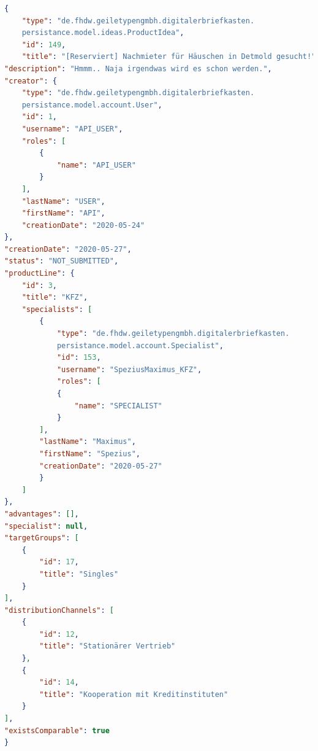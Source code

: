 \label{Anhang:Schnittstellen2}
\begin{lstlisting}[language=json, caption=Antwort /api/ideas/\{id\}, label=list:schnittstellen2]
{
    "type": "de.fhdw.geiletypengmbh.digitalerbriefkasten.
    persistance.model.ideas.ProductIdea",
    "id": 149,
    "title": "[Reserviert] Nachmieter für Häuschen in Detmold gesucht!",
"description": "Hmmm.. Naja irgendwas wird es schon werden.",
"creator": {
    "type": "de.fhdw.geiletypengmbh.digitalerbriefkasten.
    persistance.model.account.User",
    "id": 1,
    "username": "API_USER",
    "roles": [
        {
            "name": "API_USER"
        }
    ],
    "lastName": "USER",
    "firstName": "API",
    "creationDate": "2020-05-24"
},
"creationDate": "2020-05-27",
"status": "NOT_SUBMITTED",
"productLine": {
    "id": 3,
    "title": "KFZ",
    "specialists": [
        {
            "type": "de.fhdw.geiletypengmbh.digitalerbriefkasten.
            persistance.model.account.Specialist",
            "id": 153,
            "username": "SpeziusMaximus_KFZ",
            "roles": [
            {
                "name": "SPECIALIST"
            }
        ],
        "lastName": "Maximus",
        "firstName": "Spezius",
        "creationDate": "2020-05-27"
        }
    ]
},
"advantages": [],
"specialist": null,
"targetGroups": [
    {
        "id": 17,
        "title": "Singles"
    }
],
"distributionChannels": [
    {
        "id": 12,
        "title": "Stationärer Vertrieb"
    },
    {
        "id": 14,
        "title": "Kooperation mit Kreditinstituten"
    }
],
"existsComparable": true
}
\end{lstlisting}
\label{Anhang:Klassendiagramme}

